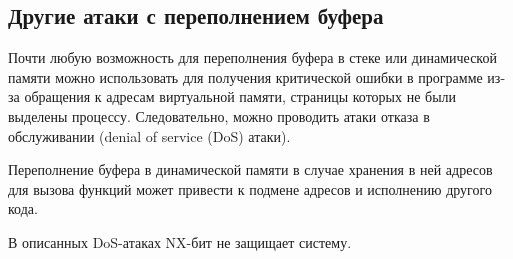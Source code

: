 \subsection{Другие атаки с переполнением буфера}

Почти любую возможность для переполнения буфера в стеке или динамической памяти можно использовать для получения критической ошибки в программе из-за обращения к адресам виртуальной памяти, страницы которых не были выделены процессу. Следовательно, можно проводить атаки отказа в обслуживании (denial of service (DoS) атаки).

Переполнение буфера в динамической памяти в случае хранения в ней адресов для вызова функций может привести к подмене адресов и исполнению другого кода.

В описанных DoS-атаках NX-бит  не защищает систему.
